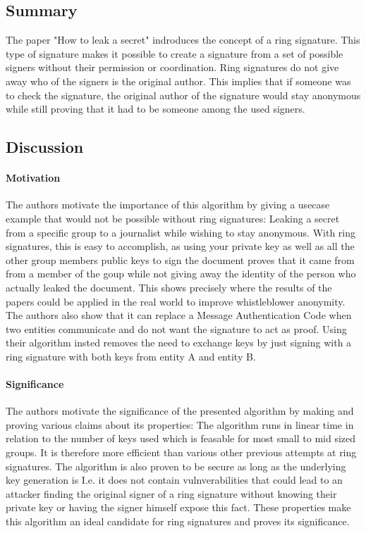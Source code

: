 \documentclass{scrartcl}
\begin{document}
\subsection{Summary}
The paper "How to leak a secret" \cite{rivest2001leak} indroduces the concept of a ring signature. This type of signature makes it possible to create a signature from a set of possible signers without their permission or coordination. Ring signatures do not give away who of the signers is the original author.  This implies that if someone was to check the signature, the original author of the signature would stay anonymous while still proving that it had to be someone among the used signers. %

\subsection{Discussion}
\paragraph{Motivation}{
The authors motivate the importance of this algorithm by giving a usecase example that would not be possible without ring signatures: Leaking a secret from a specific group to a journalist while wishing to stay anonymous. With ring signatures, this is easy to accomplish, as using your private key as well as all the other group members public keys to sign the document proves that it came from from a member of the goup while not giving away the identity of the person who actually leaked the document. This shows precisely where the results of the papers could be applied in the real world to improve whistleblower anonymity. The authors also show that it can replace a Message Authentication Code when two entities communicate and do not want the signature to act as proof. Using their algorithm insted removes the need to exchange keys by just signing with a ring signature with both keys from entity A and entity B.
}
\paragraph{Significance}{
The authors motivate the significance of the presented algorithm by making and proving various claims about its properties:
The algorithm runs in linear time in relation to the number of keys used which is feasable for most small to mid sized groups. It is therefore more efficient than various other previous attempts at ring signatures.
The algorithm is also proven to be secure as long as the underlying key generation is I.e. it does not contain vulnverabilities that could lead to an attacker finding the original signer of a ring signature without knowing their private key or having the signer himself expose this fact.
These properties make this algorithm an ideal candidate for ring signatures and proves its significance.
}
\end{document}
